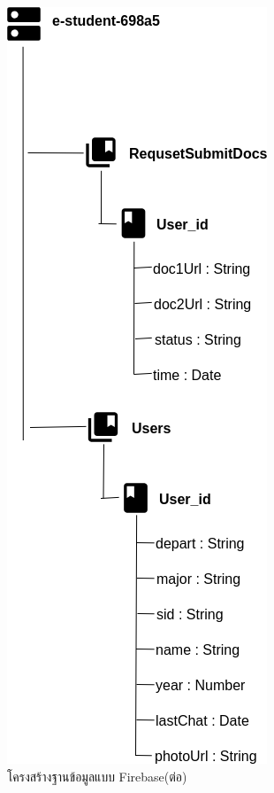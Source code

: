 	\begin{figure}[H]
	\centering
	\includegraphics[width=0.55\columnwidth]
	{Figures/3/DB/DB3}
	\caption{โครงสร้างฐานข้อมูลแบบ Firebase(ต่อ)}
	\label{Fig:DB3}
\end{figure}
